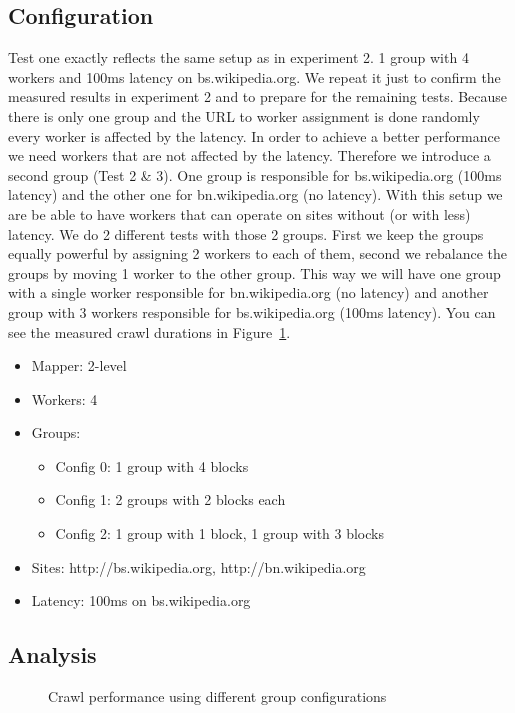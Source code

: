\subsection{Configuration}
Test one exactly reflects the same setup as in experiment 2. 1 group with 4 workers and 100ms latency on bs.wikipedia.org. We repeat it just to confirm the measured results in experiment 2 and to prepare for the remaining tests. Because there is only one group and the URL to worker assignment is done randomly every worker is affected by the latency. In order to achieve a better performance we need workers that are not affected by the latency. Therefore we introduce a second group (Test 2 \& 3). One group is responsible for bs.wikipedia.org (100ms latency) and the other one for bn.wikipedia.org (no latency). With this setup we are be able to have workers that can operate on sites without (or with less) latency. We do 2 different tests with those 2 groups. First we keep the groups equally powerful by assigning 2 workers to each of them, second we rebalance the groups by moving 1 worker to the other group. This way we will have one group with a single worker responsible for bn.wikipedia.org (no latency) and another group with 3 workers responsible for bs.wikipedia.org (100ms latency). You can see the measured crawl durations in Figure~\ref{plot:exp_003}.
\begin{itemize}
  \item Mapper: 2-level
  \item Workers: 4
  \item Groups:
    \begin{itemize}
      \item Config 0: 1 group with 4 blocks
      \item Config 1: 2 groups with 2 blocks each
      \item Config 2: 1 group with 1 block, 1 group with 3 blocks
    \end{itemize}
  \item Sites: http://bs.wikipedia.org, http://bn.wikipedia.org
  \item Latency: 100ms on bs.wikipedia.org
\end{itemize}

\subsection{Analysis}

\begin{figure}
  \centering
  \caption{Crawl performance using different group configurations}
  \label{plot:exp_003}
\end{figure}
